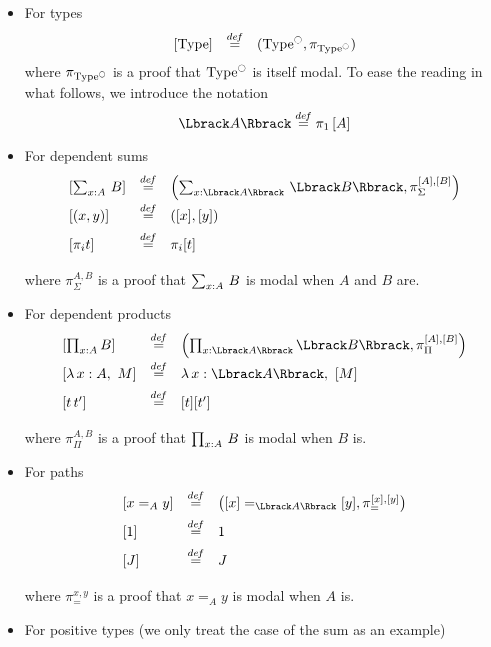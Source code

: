 \begin{itemize}
\item For types
\[
\begin{array}{lcl}
  \left[ \operatorname{Type}\right] &\overset{de\hspace{-0.2ex}f}{=}& (\operatorname{Type}^{\ocircle},\pi_{\operatorname{Type}^{\ocircle}})
\end{array}
\]
where $\pi_{\operatorname{Type}^{\ocircle}}$ is a proof that $\operatorname{Type}^{\ocircle}$ is itself
modal.
To ease the reading in what follows, we introduce the notation  \[ 
  \Lbrack A \Rbrack \defeq \pi_1 \left[ A \right]\]

\item For dependent sums
\[
\begin{array}{lcl}
\left[ \sumD x A B \right] &\defeq&  \left( \sumD x{\Lbrack A \Rbrack}
                                  {\Lbrack B\Rbrack} , \pi_\Sigma^{[A],[B]}
                                \right)\\[0.5em]
  \left[  (x,y)\right] &\defeq& ([x],[y]) \\[0.5em]
  \left[  \pi_i t\right] &\defeq& \pi_i [t] \\[0.5em]
\end{array}
\]
where $\pi_{\Sigma}^{A,B}$ is a proof that $\sum_{x:A}\, B$ is modal when
$A$ and $B$ are.
\item For dependent products
\[
\begin{array}{lcl}
 \left[ \prod_{x:A} B \right] &\defeq& \left( \prod_{x:\Lbrack A \Rbrack}
                                   \Lbrack B\Rbrack , \pi_{\Pi}^{[A],[B]}
                                  \right)\\[0.5em]
\left[  \lambda\, x:A,~M \right] &\defeq&\lambda\,x:\Lbrack A
                                     \Rbrack,~[ M ]
  \\[0.5em]
  \left[ t \, t' \right] &\defeq& [t] [t'] \\[0.5em]
\end{array}
\]
where $\pi_{\Pi}^{A,B}$ is a proof that $\prod_{x:A}\, B$ is modal when $B$ is.
\item For paths
\[
\begin{array}{lcl}
\left[  x=_A y \right] &\defeq& \left( [x] =_{\Lbrack A\Rbrack} [y] , \pi_=^{[x],[y]}
                             \right)\\[0.5em]
\left[ 1 \right] &\defeq& 1\\[0.5em]
\left[ J \right] &\defeq& J \\[0.5em]
\end{array}
\]
where $\pi_{=}^{x,y}$ is a proof that $x=_A y$ is modal when $A$ is.
\item For positive types (we only treat the case of the sum as an example)

\end{itemize}
